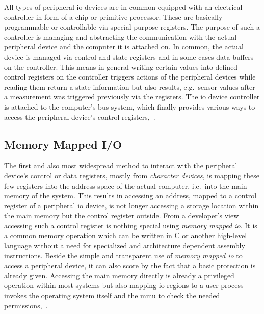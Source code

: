 All types of peripheral \ac{io} devices are in common equipped with an electrical controller in form of a chip or primitive processor.
These are basically programmable or controllable via special purpose registers.
The purpose of such a controller is managing and abstracting the communication with the actual peripheral device and the computer it is attached on.
In common, the actual device is managed via control and state registers and in some cases data buffers on the controller.
This means in general writing certain values into defined control registers on the controller triggers actions of the peripheral devices while reading them return a state information but also results, e.g.\ sensor values after a measurement was triggered previously via the registers.
The \ac{io} device controller is attached to the computer's bus system, which finally provides various ways to access the peripheral device's control registers\cite{tanenbaum-modern-operating-systems},~\cite{glatz2015betriebssysteme}. 

\subsection{Memory Mapped I/O}
The first and also most widespread method to interact with the peripheral device's control or data registers, mostly from \textit{character devices}, is mapping these few registers into the address space of the actual computer, i.e.\ into the main memory of the system.
This results in accessing an address, mapped to a control register of a peripheral \ac{io} device, is not longer accessing a storage location within the main memory but the control register outside.
From a developer's view accessing such a control register is nothing special using \textit{memory mapped \ac{io}}.
It is a common memory operation which can be written in C or another high-level language without a need for specialized and architecture dependent assembly instructions.
Beside the simple and transparent use of \textit{memory mapped \ac{io}} to access a peripheral device, it can also score by the fact that a basic protection is already given.
Accessing the main memory directly is already a privileged operation within most systems but also mapping \ac{io} regions to a user process invokes the operating system itself and the \ac{mmu} to check the needed permissions\cite{tanenbaum-modern-operating-systems},~\cite{brause2017betriebssysteme}.  

